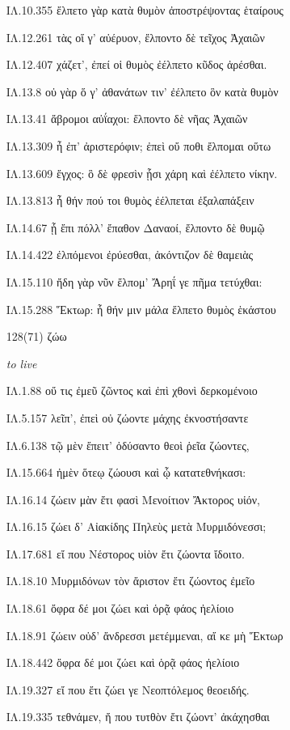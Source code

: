 \begin{enumerate}
{ΙΛ.10.355 ἔλπετο γὰρ κατὰ θυμὸν ἀποστρέψοντας ἑταίρους

ΙΛ.12.261 τὰς οἵ γ' αὐέρυον, ἔλποντο δὲ τεῖχος Ἀχαιῶν

ΙΛ.12.407 χάζετ', ἐπεί οἱ θυμὸς ἐέλπετο κῦδος ἀρέσθαι.

ΙΛ.13.8 οὐ γὰρ ὅ γ' ἀθανάτων τιν' ἐέλπετο ὃν κατὰ θυμὸν

ΙΛ.13.41 ἄβρομοι αὐΐαχοι: ἔλποντο δὲ νῆας Ἀχαιῶν

ΙΛ.13.309 ἦ ἐπ' ἀριστερόφιν; ἐπεὶ οὔ ποθι ἔλπομαι οὕτω

ΙΛ.13.609 ἔγχος: ὃ δὲ φρεσὶν ᾗσι χάρη καὶ ἐέλπετο νίκην.

ΙΛ.13.813 ἦ θήν πού τοι θυμὸς ἐέλπεται ἐξαλαπάξειν

ΙΛ.14.67 ᾗ ἔπι πόλλ' ἔπαθον Δαναοί, ἔλποντο δὲ θυμῷ

ΙΛ.14.422 ἐλπόμενοι ἐρύεσθαι, ἀκόντιζον δὲ θαμειὰς

ΙΛ.15.110 ἤδη γὰρ νῦν ἔλπομ' Ἄρηΐ γε πῆμα τετύχθαι:

ΙΛ.15.288 Ἕκτωρ: ἦ θήν μιν μάλα ἔλπετο θυμὸς ἑκάστου

}

\clearpage
\item[\large 128(71)]{\large \g ζώω	}

\hspace{0.2cm} \textit{ to live }

{\g
ΙΛ.1.88 οὔ τις ἐμεῦ ζῶντος καὶ ἐπὶ χθονὶ δερκομένοιο

ΙΛ.5.157 λεῖπ', ἐπεὶ οὐ ζώοντε μάχης ἐκνοστήσαντε

ΙΛ.6.138 τῷ μὲν ἔπειτ' ὀδύσαντο θεοὶ ῥεῖα ζώοντες,

ΙΛ.15.664 ἠμὲν ὅτεῳ ζώουσι καὶ ᾧ κατατεθνήκασι:

ΙΛ.16.14 ζώειν μὰν ἔτι φασὶ Μενοίτιον Ἄκτορος υἱόν,

ΙΛ.16.15 ζώει δ' Αἰακίδης Πηλεὺς μετὰ Μυρμιδόνεσσι;

ΙΛ.17.681 εἴ που Νέστορος υἱὸν ἔτι ζώοντα ἴδοιτο.

ΙΛ.18.10 Μυρμιδόνων τὸν ἄριστον ἔτι ζώοντος ἐμεῖο

ΙΛ.18.61 ὄφρα δέ μοι ζώει καὶ ὁρᾷ φάος ἠελίοιο

ΙΛ.18.91 ζώειν οὐδ' ἄνδρεσσι μετέμμεναι, αἴ κε μὴ Ἕκτωρ

ΙΛ.18.442 ὄφρα δέ μοι ζώει καὶ ὁρᾷ φάος ἠελίοιο

ΙΛ.19.327 εἴ που ἔτι ζώει γε Νεοπτόλεμος θεοειδής.

ΙΛ.19.335 τεθνάμεν, ἤ που τυτθὸν ἔτι ζώοντ' ἀκάχησθαι

}
\end{enumerate}
